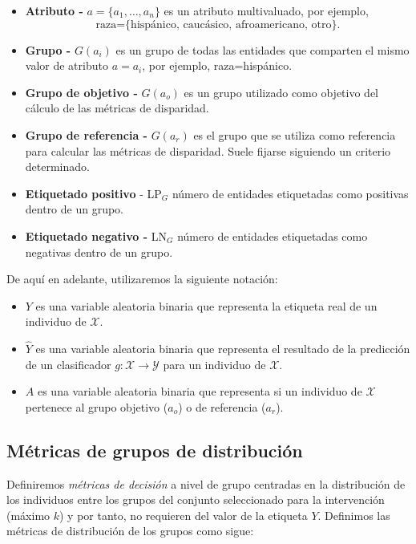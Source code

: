 \documentclass[oneside,openright,titlepage,numbers=noenddot,openany,headinclude,footinclude=true,
cleardoublepage=empty,abstractoff,BCOR=5mm,paper=a4,fontsize=12pt,main=spanish]{scrreprt}
\begin{document}
\begin{itemize}
    \item \textbf{Atributo -} $a = \{a_1,\dots,a_n\}$ es un atributo multivaluado, por ejemplo, $$\text{raza=\{hispánico, caucásico, afroamericano, otro\}}.$$
    \item \textbf{Grupo -} $G(a_i)$ es un grupo de todas las entidades que comparten el mismo valor de atributo $a=a_i$, por ejemplo, raza=hispánico.
    \item \textbf{Grupo de objetivo -} $G(a_o)$ es un grupo utilizado como objetivo del cálculo de las métricas de disparidad.
    \item \textbf{Grupo de referencia -} $G(a_r)$ es el grupo que se utiliza como referencia para calcular las métricas de disparidad. Suele fijarse siguiendo un criterio determinado.
    \item \textbf{Etiquetado positivo} - LP$_G$ número de entidades etiquetadas como positivas dentro de un grupo.
    \item \textbf{Etiquetado negativo -} LN$_G$ número de entidades etiquetadas como negativas dentro de un grupo.
\end{itemize}

\begin{notation}
De aquí en adelante, utilizaremos la siguiente notación:

\begin{itemize}
    \item $Y$ es una variable aleatoria binaria que representa la etiqueta real de un individuo de $\mathcal{X}.$
    \item $\hat{Y}$ es una variable aleatoria binaria que representa el resultado de la predicción de un clasificador $g\colon \mathcal{X} \to \mathcal{Y}$ para un individuo de $\mathcal{X}.$
    \item $A$ es una variable aleatoria binaria que representa si un individuo de $\mathcal{X}$ pertenece al grupo objetivo ($a_o$) o de referencia ($a_r$).
\end{itemize}
\end{notation}

\subsection*{Métricas de grupos de distribución}

Definiremos \textit{métricas de decisión} a nivel de grupo centradas en la distribución de los individuos entre los grupos del conjunto seleccionado para la intervención (máximo $k$) y por
tanto, no requieren del valor de la etiqueta $Y$. Definimos las métricas de distribución de los grupos como sigue:
\end{document}
